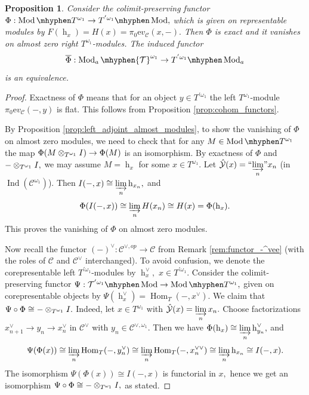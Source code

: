 \documentclass[11pt,leqno]{amsart}
\newtheorem{prop}[theo]{Proposition}
\numberwithin{equation}{section}
\def\h{\operatorname{h}}
\def\Hom{\operatorname{Hom}}
\newcommand{\tens}[1]{%
  \mathbin{\mathop{\otimes}\displaylimits_{#1}}%
}
\newcommand{\hy}{\mhyphen}
\newcommand{\indlim}[1][]{\mathop{\varinjlim}\limits_{#1}}
\newcommand{\inddlim}[1][]{{``{\indlim[#1]}"}}
\newcommand{\bbar}{\overline}
\newcommand{\ev}{\mathrm ev}
\newcommand{\cC}{{\mathcal C}}
\newcommand{\cY}{{\mathcal Y}}
\newcommand{\cT}{{\mathcal T}}
\newcommand{\Ind}{\operatorname{Ind}}
\newcommand{\Mod}{\operatorname{Mod}}
\begin{document}
\begin{prop}\label{prop:equivalence_on_almost_modules}
Consider the colimit-preserving functor $\Phi:\Mod\hy T^{\omega_1}\to T^{'\omega_1}\hy\Mod,$ which is given on representable modules by $F(\h_x)=H(x)=\pi_0\ev_{\cC}(x,-).$ Then $\Phi$ is exact and it vanishes on almost zero right $T^{\omega_1}$-modules. The induced functor 
\begin{equation}\label{eq:equivalence_on_almost_modules}
\bbar{\Phi}:\Mod_a\hy\cT^{\omega_1}\to T^{'\omega_1}\hy\Mod_a
\end{equation}
is an equivalence.
\end{prop}

\begin{proof}
Exactness of $\Phi$ means that for an object $y\in T^{'\omega_1}$ the left $T^{\omega_1}$-module $\pi_0\ev_{\cC}(-,y)$ is flat. This follows from Proposition \ref{prop:cohom_functors}. 

By Proposition \ref{prop:left_adjoint_almost_modules}, to show the vanishing of $\Phi$ on almost zero modules, we need to check that for any $M\in \Mod\hy T^{\omega_1}$ the map $\Phi(M\tens{T^{\omega_1}}I)\to\Phi(M)$ is an isomorphism. By exactness of $\Phi$ and $-\tens{T^{\omega_1}}I,$ we may assume $M=\h_x$ for some $x\in T^{\omega_1}.$ Let $\hat{\cY}(x)=\inddlim[n]x_n$ (in $\Ind(\cC^{\omega_1})$). Then $I(-,x)\cong\indlim[n]\h_{x_n},$ and
\begin{equation*}
\Phi(I(-,x))\cong\indlim[n]H(x_n)\cong H(x)=\Phi(\h_x).
\end{equation*}
This proves the vanishing of $\Phi$ on almost zero modules.

Now recall the functor $(-)^{\vee}:\cC^{\vee,op}\to\cC$ from Remark \ref{rem:functor_-^vee} (with the roles of $\cC$ and $\cC^{\vee}$ interchanged). To avoid confusion, we denote the corepresentable left $T^{'\omega_1}$-modules by $\h_x^{\vee},$ $x\in T^{'\omega_1}.$ Consider the colimit-preserving functor $\Psi:\cT^{'\omega_1}\hy\Mod\to\Mod\hy T^{\omega_1},$ given on corepresentable objects by $\Psi(\h_x^{\vee})=\Hom_T(-,x^{\vee}).$ We claim that $\Psi\circ\Phi\cong -\tens{T^{\omega_1}}I.$ Indeed, let $x\in T^{\omega_1}$ with $\hat{\cY}(x)=\indlim[n]x_n.$ Choose factorizations $x_{n+1}^{\vee}\to y_n\to x_n^{\vee}$ in $\cC^{\vee}$ with $y_n\in\cC^{\vee,\omega_1}.$ Then we have $\Phi(\h_x)\cong \indlim[n]\h_{y_n}^{\vee},$ and
\begin{equation*}
\Psi(\Phi(x))\cong \indlim[n]\Hom_T(-,y_n^{\vee})\cong \indlim[n]\Hom_T(-,x_n^{\vee\vee})\cong \indlim[n]\h_{x_n}\cong I(-,x).
\end{equation*}
The isomorphism $\Psi(\Phi(x))\cong I(-,x)$ is functorial in $x,$ hence we get an isomorphism $\Psi\circ\Phi\cong -\tens{T^{\omega_1}}I,$ as stated.


\end{proof}
\end{document}
